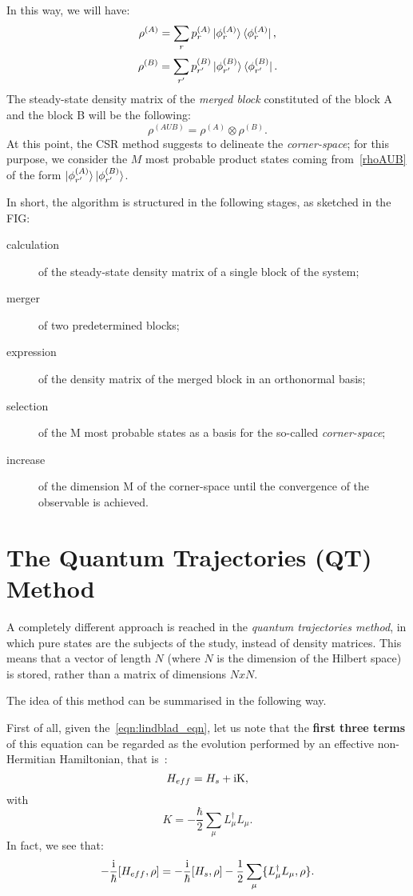 In this way, we will have:
\begin{equation}
    \rho^{(A)} = \sum_r p_r^{(A)}\ket{\phi_r^{(A)}}\bra{\phi_r^{(A)}},
\end{equation}
\begin{equation}
    \rho^{(B)} = \sum_{r'} p_{r'}^{(B)}\ket{\phi_{r'}^{(B)}}\bra{\phi_{r'}^{(B)}}.
\end{equation}
The steady-state density matrix of the \emph{merged block} constituted of the block A and the block B will be the following:
\begin{equation}
\label{rhoAUB}
    \rho^{(AUB)} = \rho^{(A)} \otimes \rho^{(B)}.
\end{equation}
At this point, the CSR method suggests to delineate the \emph{corner-space}; for this purpose, we consider the $M$ most probable product states coming from~\ref{rhoAUB} of the form $\ket{\phi_{r'}^{(A)}}\ket{\phi_{r'}^{(B)}}$. 

\medskip
In short, the algorithm is structured in the following stages, as sketched in the FIG:
\begin{description}
    \item[calculation] of the steady-state density matrix of a single block of the system;
    \item[merger] of two predetermined blocks;
    \item[expression] of the density matrix of the merged block in an orthonormal basis;
    \item[selection] of the M most probable states as a basis for the so-called \emph{corner-space};
    \item[increase] of the dimension M of the corner-space until the convergence of the observable is achieved.
\end{description}


\section{The Quantum Trajectories (QT) Method}
A completely different approach is reached in the \emph{quantum trajectories method}, in which pure states are the subjects of the study, instead of density matrices. This means that a vector of length $N$ (where $N$ is the dimension of the Hilbert space) is stored, rather than a matrix of dimensions $NxN$.

The idea of this method can be summarised in the following way.

First of all, given the~\ref{eqn:lindblad_eqn}, let us note that the \textbf{first three terms} of this equation can be regarded as the evolution performed by an effective non-Hermitian Hamiltonian, that is~\cite{PhysRevA.69.062317}:
\[
H_{eff} = H_s + \rm{i}K,
\]
with
\[
K = -\frac{\hbar}{2}\sum_\mu L_{\mu}^{\dagger}L_{\mu}.
\]
In fact, we see that:
\[
    -\frac{\rm{i}}{\hbar}[H_{eff}, \rho] = -\frac{\rm{i}}{\hbar}[H_s, \rho] - \frac{1}{2}\sum_\mu \{L_{\mu}^{\dagger}L_{\mu}, \rho\}.
\]

